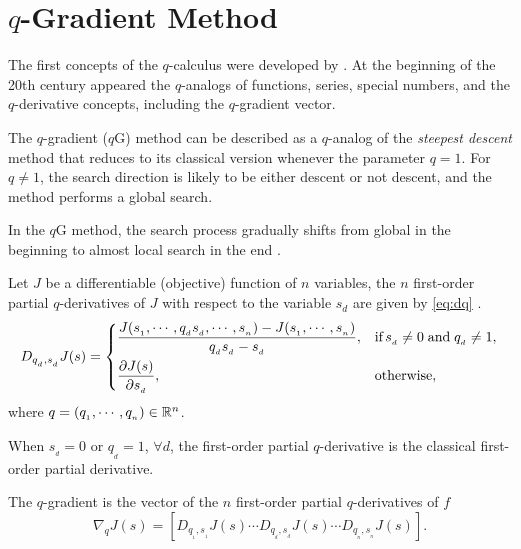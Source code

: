 \section{\texorpdfstring{$q$}{q}-Gradient Method}
\label{sec:qg}

The first concepts of the $q$-calculus were developed by . At the beginning of the 20th century appeared the $q$-analogs of functions, series, special numbers, and the $q$-derivative concepts, including the $q$-gradient vector.

The $q$-gradient ($q$G) method can be described as a $q$-analog of the \textit{steepest descent} method that reduces to its classical version whenever the parameter $q=1$. For $q \neq 1$, the search direction is likely to be either descent or not descent, and the method performs a global search.

In the $q$G method, the search process gradually shifts from global in the beginning to almost local search in the end \cite{soterroni12a}.

\begin{definition}
Let $J$ be a differentiable (objective) function of $n$ variables, the $n$ first-order partial $q$-derivatives of $J$ with respect to the variable $s_d$ are given by \autoref{eq:dq} \cite{soterroni2011,soterroni12a,soterroni13}.
%
\begin{equation}
\label{eq:dq}
D_{q_{_d},s_{_d}} J(s) =
\begin{dcases}
\dfrac{J(s_{_1}, \cdots,q_{_d} s_{_d}, \cdots, s_{_n}) - J(s_{_1}, \cdots, s_{_n}) }{q_{_d} s_{_d} -  s_{_d}},  & \text{if} \, s_{_d}  \neq 0 \; \textrm{and} \; q_{_d} \neq 1, \\
\dfrac{\partial J(s)}{\partial s_{_d}}, & \text{otherwise},
\end{dcases}
\end{equation}
%
where $ q =  \left( q_{_1}, \cdots, q_{_n} \right) \in \mathbb{R}^n $.
\end{definition}

When $s_{_d} = 0$ or $q_{_d} = 1$, $\forall d$, the first-order partial $q$-derivative is the classical first-order partial derivative.

\begin{definition}
The $q$-gradient is the vector of the $n$ first-order partial $q$-derivatives of $f$ \cite{soterroni2011,soterroni12a,soterroni13}
%
\begin{equation}
\label{eq:qgradient}
\nabla_{q}J(s) = \left[D_{q_{_1},s_{_1}} J(s) \cdots D_{q_{_d},s_{_d}} J(s) \cdots D_{q_{_n},s_{_n}} J(s)\right]. 
\end{equation}
\end{definition}

